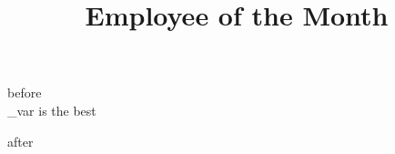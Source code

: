 \documentclass[10pt,a4paper,landscape]{letter}
\title{Employee of the Month}
\begin{document}
before\\
\my_var is the best \par
after
\end{document}
